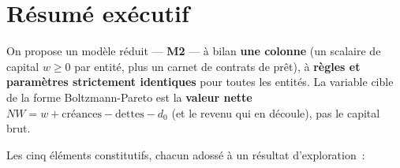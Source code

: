 \documentclass[11pt,a4paper]{article}
\newcommand{\NW}{\mathit{NW}}
\begin{document}
\tableofcontents

\section*{Résumé exécutif}

On propose un modèle réduit --- \textbf{M2} --- à bilan \textbf{une colonne} (un scalaire de capital $w \geq 0$ par entité, plus un carnet de contrats de prêt), à \textbf{règles et paramètres strictement identiques} pour toutes les entités. La variable cible de la forme Boltzmann-Pareto est la \textbf{valeur nette} $\NW = w + \text{créances} - \text{dettes} - d_0$ (et le revenu qui en découle), pas le capital brut.

Les cinq éléments constitutifs, chacun adossé à un résultat d'exploration~:
\end{document}
